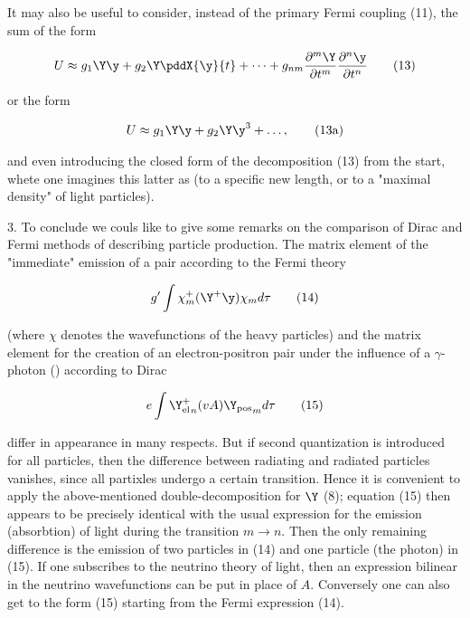 \documentclass{article}
\newcommand{\nequ}[2]{
\begin{align*}
#1
\tag{#2}
\end{align*}
}
\begin{document}
It may also be useful to consider, instead of the primary Fermi coupling (11), the sum of the form
\nequ{
U \approx g_1 \Y\y + g_2 \Y\pddX{\y}{t} + \dots + g_{nm}\frac{\partial^m\Y}{\partial t^m}
\frac{\partial^n\y}{\partial t^n}
}{13}
or the form
\nequ{
U \approx g_1 \Y\y + g_2 \Y\y^3 + \dots,
}{13a}
and even introducing the closed form of the decomposition (13) from the start, whete one imagines this latter as  (to a specific new length, or to a "maximal density" of light particles).

3. To conclude we couls like to give some remarks on the comparison of Dirac and Fermi methods of describing particle production. The matrix element of the "immediate" emission of a pair according to the Fermi theory
\nequ{
g'\int{\chi_m^+(\Y^+\y)\chi_m{d\tau}}
}{14}
(where $\chi$ denotes the wavefunctions of the heavy particles) and the matrix element for the creation of an electron-positron pair under the influence of a $\gamma$-photon () according to Dirac
\nequ{
e\int{{\Y^+_\text{el}}_n (vA){\Y_\text{pos}}_m {d\tau}}
}{15}
differ in appearance in many respects. But if second quantization is introduced for all particles, then the difference between radiating and radiated particles vanishes, since all partixles undergo a certain transition. Hence it is convenient to apply the above-mentioned double-decomposition for $\Y$ (8); equation (15) then appears to be precisely identical with the usual expression for the emission (absorbtion) of light during the transition $m \to n$. Then the only remaining difference is the emission of two particles in (14) and one particle (the photon) in (15). If one subscribes to the neutrino theory of light, then an expression bilinear in the neutrino wavefunctions can be put in place of $A$. Conversely one can also get to the form (15) starting from the Fermi expression (14).
\end{document}
